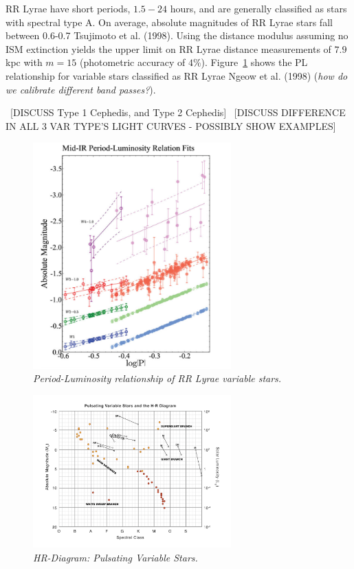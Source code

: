 \documentclass[letterpaper,11pt]{article}
\begin{document}
RR Lyrae have short periods, $1.5 - 24$ hours, and are generally classified as stars with spectral type A.  On average, absolute magnitudes of RR Lyrae stars fall between 0.6-0.7 Tsujimoto et al. (1998). Using the distance modulus assuming no ISM extinction yields the upper limit on RR Lyrae distance measurements of $7.9$ kpc with $m=15$ (photometric accuracy of $4\%$). Figure~\ref{fig:plrelationrrlyrae} shows the PL relationship for variable stars classified as RR Lyrae Ngeow et al. (1998) (\textit{how do we calibrate different band passes?}).

~[DISCUSS Type 1 Cephedis, and Type 2 Cephedis]
~[DISCUSS DIFFERENCE IN ALL 3 VAR TYPE'S LIGHT CURVES - POSSIBLY SHOW EXAMPLES]

\begin{figure}[htb!]
  \begin{center}
\centerline{\includegraphics[width=3in]{figures/PL_relation}}
\caption{\it \small{Period-Luminosity relationship of RR Lyrae variable stars. \label{fig:plrelationrrlyrae}}}
  \end{center}
\end{figure}
\begin{figure}[htb!]
  \begin{center}
\centerline{\includegraphics[width=3in]{figures/var_star_HR.png}}
\caption{\it \small{HR-Diagram: Pulsating Variable Stars. \label{fig:var-star-hr}}}
  \end{center}
\end{figure}
\end{document}
